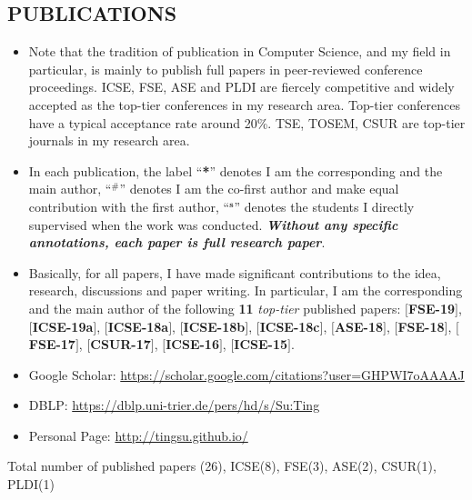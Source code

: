 \documentclass[margin]{res}
\begin{document}
\begin{resume}
\section{PUBLICATIONS}
\begin{itemize}[leftmargin=*]
    \item Note that the tradition of publication in Computer Science, and my field in particular, is mainly
to publish full papers in peer-reviewed conference proceedings. ICSE, FSE, ASE and PLDI are fiercely competitive and widely accepted as the top-tier conferences in my research area. Top-tier conferences have a typical acceptance rate around 20\%. TSE, TOSEM, CSUR are top-tier journals in my research area.
    \item In each publication, the label ``\textbf{*}'' denotes I am the corresponding and the main author, ``$^{\textbf{\#}}$'' denotes I am the co-first author and make equal contribution with the first author,  ``$^{\textbf{s}}$'' denotes the students I directly supervised when the work was conducted. \emph{\textbf{Without any specific annotations, each paper is full research paper}}.
    \item Basically, for all papers, I have made significant contributions to the idea, research, discussions and paper writing. In particular, I am the corresponding and the main author of the following \textbf{11} \emph{top-tier} published papers: $[$\textbf{FSE-19}$]$, $[$\textbf{ICSE-19a}$]$, $[$\textbf{ICSE-18a}$]$, $[$\textbf{ICSE-18b}$]$, $[$\textbf{ICSE-18c}$]$, $[$\textbf{ASE-18}$]$, $[$\textbf{FSE-18}$]$, $[$\textbf{FSE-17}$]$, $[$\textbf{CSUR-17}$]$, $[$\textbf{ICSE-16}$]$, $[$\textbf{ICSE-15}$]$.
\end{itemize}

\begin{itemize}[leftmargin=*]
    \item Google Scholar: \url{https://scholar.google.com/citations?user=GHPWI7oAAAAJ}
    \item DBLP: \url{https://dblp.uni-trier.de/pers/hd/s/Su:Ting}
    \item Personal Page: \url{http://tingsu.github.io/}
\end{itemize}

 Total number of published papers (26), ICSE(8), FSE(3), ASE(2), CSUR(1), PLDI(1)


\end{resume}
\end{document}
